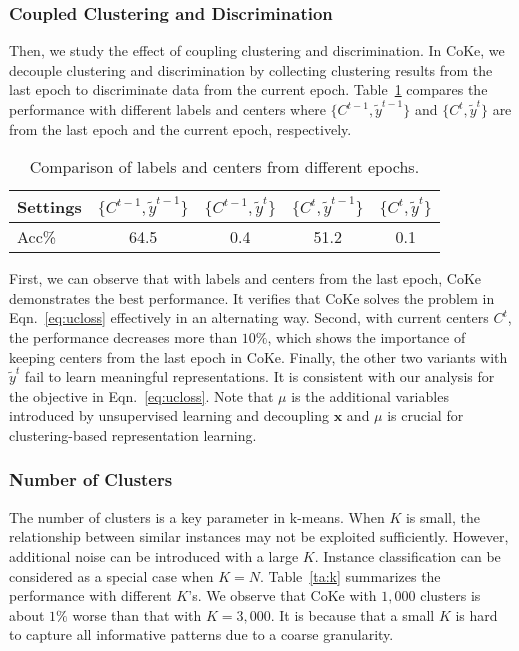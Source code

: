 \documentclass[10pt,twocolumn,letterpaper]{article}
\def \x {\mathbf{x}}
\begin{document}
\subsubsection{Coupled Clustering and Discrimination}
Then, we study the effect of coupling clustering and discrimination. In CoKe, we decouple clustering and discrimination by collecting clustering results from the last epoch to discriminate data from the current epoch. Table~\ref{ta:lc} compares the performance with different labels and centers where $\{C^{t-1}, \tilde{y}^{t-1}\}$ and $\{C^{t}, \tilde{y}^{t}\}$ are from the last epoch and the current epoch, respectively.

\begin{table}[!ht]
\centering
\scriptsize
\begin{tabular}{|l|c|c|c|c|}\hline
Settings&$\{C^{t-1}, \tilde{y}^{t-1}\}$&$\{C^{t-1}, \tilde{y}^{t}\}$&$\{C^{t}, \tilde{y}^{t-1}\}$&$\{C^{t}, \tilde{y}^{t}\}$\\\hline
Acc\% &64.5&0.4& 51.2&0.1\\\hline
\end{tabular}
\caption{Comparison of labels and centers from different epochs.}\label{ta:lc}
\end{table}

First, we can observe that with labels and centers from the last epoch, CoKe demonstrates the best performance. It verifies that CoKe solves the problem in Eqn.~\ref{eq:ucloss} effectively in an alternating way. Second, with current centers $C^t$, the performance decreases more than $10\%$, which shows the importance of keeping centers from the last epoch in CoKe. Finally, the other two variants with $\tilde{y}^{t}$ fail to learn meaningful representations. It is consistent with our analysis for the objective in Eqn.~\ref{eq:ucloss}. Note that $\mu$ is the additional variables introduced by unsupervised learning and decoupling $\x$ and $\mu$ is crucial for clustering-based representation learning.



\subsubsection{Number of Clusters}
The number of clusters is a key parameter in k-means. When $K$ is small, the relationship between similar instances may not be exploited sufficiently. However, additional noise can be introduced with a large $K$. Instance classification can be considered as a special case when $K=N$. Table~\ref{ta:k} summarizes the performance with different $K$'s. We observe that CoKe with $1,000$ clusters is about $1\%$ worse than that with $K=3,000$. It is because that a small $K$ is hard to capture all informative patterns due to a coarse granularity. 
\end{document}
